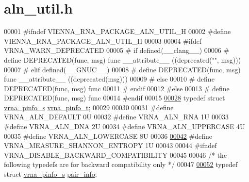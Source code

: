 \hypertarget{aln__util_8h_source}{}\section{aln\+\_\+util.\+h}
\label{aln__util_8h_source}

\begin{DoxyCode}
00001 \textcolor{preprocessor}{#ifndef VIENNA\_RNA\_PACKAGE\_ALN\_UTIL\_H}
00002 \textcolor{preprocessor}{#define VIENNA\_RNA\_PACKAGE\_ALN\_UTIL\_H}
00003 
00004 \textcolor{preprocessor}{#ifdef VRNA\_WARN\_DEPRECATED}
00005 \textcolor{preprocessor}{# if defined(\_\_clang\_\_)}
00006 \textcolor{preprocessor}{#  define DEPRECATED(func, msg) func \_\_attribute\_\_ ((deprecated("", msg)))}
00007 \textcolor{preprocessor}{# elif defined(\_\_GNUC\_\_)}
00008 \textcolor{preprocessor}{#  define DEPRECATED(func, msg) func \_\_attribute\_\_ ((deprecated(msg)))}
00009 \textcolor{preprocessor}{# else}
00010 \textcolor{preprocessor}{#  define DEPRECATED(func, msg) func}
00011 \textcolor{preprocessor}{# endif}
00012 \textcolor{preprocessor}{#else}
00013 \textcolor{preprocessor}{# define DEPRECATED(func, msg) func}
00014 \textcolor{preprocessor}{#endif}
00015 
\hyperlink{group__aln__utils_ga6660dfca23debee7306e0cd53341263f}{00028} \textcolor{keyword}{typedef} \textcolor{keyword}{struct }\hyperlink{group__aln__utils_structvrna__pinfo__s}{vrna\_pinfo\_s} \hyperlink{group__aln__utils_structvrna__pinfo__s}{vrna\_pinfo\_t};
00029 
00030 
00031 \textcolor{preprocessor}{#define VRNA\_ALN\_DEFAULT      0U}
00032 \textcolor{preprocessor}{#define VRNA\_ALN\_RNA          1U}
00033 \textcolor{preprocessor}{#define VRNA\_ALN\_DNA          2U}
00034 \textcolor{preprocessor}{#define VRNA\_ALN\_UPPERCASE    4U}
00035 \textcolor{preprocessor}{#define VRNA\_ALN\_LOWERCASE    8U}
00036 
\hyperlink{group__aln__utils_ga1e659227c9fc077d29989f576f129000}{00042} \textcolor{preprocessor}{#define VRNA\_MEASURE\_SHANNON\_ENTROPY  1U}
00043 
00044 \textcolor{preprocessor}{#ifndef VRNA\_DISABLE\_BACKWARD\_COMPATIBILITY}
00045 
00046 \textcolor{comment}{/* the following typedefs are for backward compatibility only */}
00047 
\hyperlink{group__aln__utils_ga7b61662a793ad0aa1ea38efc3a5baacc}{00052} \textcolor{keyword}{typedef} \textcolor{keyword}{struct }\hyperlink{group__aln__utils_structvrna__pinfo__s}{vrna\_pinfo\_s} \hyperlink{group__aln__utils_structvrna__pinfo__s}{pair\_info};

\end{DoxyCode}
